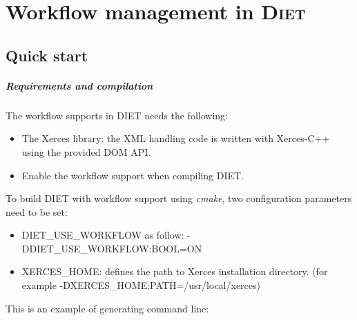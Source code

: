 
\chapter{Workflow management in \textsc{Diet}}

\section{Quick start}


\paragraph{Requirements and compilation}

The workflow supports in \textsc{DIET} needs the following:

\begin{itemize}
\item The Xerces library: the XML handling code is written with
  Xerces-C++ using the provided DOM API.
\item Enable the workflow support when compiling DIET.
\end{itemize}

To build DIET with workflow support using \textit{cmake}, two
configuration parameters need to be set:

\begin{itemize}
\item DIET\_USE\_WORKFLOW as follow: -DDIET\_USE\_WORKFLOW:BOOL=ON
\item XERCES\_HOME: defines the path to Xerces installation directory.
  (for example -DXERCES\_HOME:PATH=/usr/local/xerces)
\end{itemize}

This is an example of generating command line:

